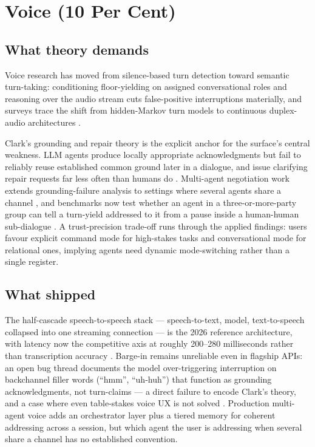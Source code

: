 \section{Voice (10 Per Cent)}

\subsection{What theory demands}

Voice research has moved from silence-based turn detection toward semantic turn-taking: conditioning floor-yielding on assigned conversational roles and reasoning over the audio stream cuts false-positive interruptions materially, and surveys trace the shift from hidden-Markov turn models to continuous duplex-audio architectures \parencite{AdaptiveTurnTaking2026, TurnTakingSurvey2025, ChronologicalThinking2025}.

Clark's grounding and repair theory is the explicit anchor for the surface's central weakness. LLM agents produce locally appropriate acknowledgments but fail to reliably reuse established common ground later in a dialogue, and issue clarifying repair requests far less often than humans do \parencite{GroundingRifts2025, RepairTaxonomy2025, ConvGrounding2024}. Multi-agent negotiation work extends grounding-failure analysis to settings where several agents share a channel \parencite{TalkCheap2026}, and benchmarks now test whether an agent in a three-or-more-party group can tell a turn-yield addressed to it from a pause inside a human-human sub-dialogue \parencite{SpeakStaySilent2026}. A trust-precision trade-off runs through the applied findings: users favour explicit command mode for high-stakes tasks and conversational mode for relational ones, implying agents need dynamic mode-switching rather than a single register.

\subsection{What shipped}

The half-cascade speech-to-speech stack --- speech-to-text, model, text-to-speech collapsed into one streaming connection --- is the 2026 reference architecture, with latency now the competitive axis at roughly 200--280 milliseconds rather than transcription accuracy \parencite{Deepgram2026}. Barge-in remains unreliable even in flagship APIs: an open bug thread documents the model over-triggering interruption on backchannel filler words (``hmm'', ``uh-huh'') that function as grounding acknowledgments, not turn-claims --- a direct failure to encode Clark's theory, and a case where even table-stakes voice UX is not solved \parencite{RealtimeBargeIn2026, RepairScoping2024}. Production multi-agent voice adds an orchestrator layer plus a tiered memory for coherent addressing across a session, but which agent the user is addressing when several share a channel has no established convention.

